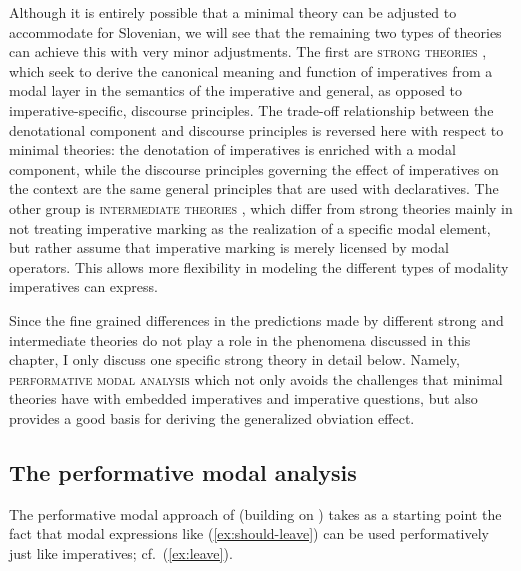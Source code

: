 \documentclass[output=paper,colorlinks,citecolor=brown]{langscibook}
\begin{document}
Although it is entirely possible that a minimal theory can be adjusted to accommodate for Slovenian, we will see that the remaining two types of theories can achieve this with very minor adjustments. The first are \textsc{strong theories} \citep[e.g.][]{schwagerDISS,kaufmannBOOK,grosz09nels,condoravdi-lauer12cssp}, which seek to derive the canonical meaning and function of imperatives from a modal layer in the semantics of the imperative and general, as opposed to imperative-specific, discourse principles. The trade-off relationship between the denotational component and discourse principles is reversed here with respect to minimal theories: the denotation of imperatives is enriched with a modal component, while the discourse principles governing the effect of imperatives on the context are the same general principles that are used with declaratives. 
The other group is \textsc{intermediate theories} \citep[e.g.][]{portner97,roberts15,oikonomou16}, which differ from strong theories mainly in not treating imperative marking as the realization of a specific modal element, but rather assume that imperative marking is merely licensed by modal operators. This allows more flexibility in modeling the different types of modality imperatives can express. 

Since the fine grained differences in the predictions made by different strong and intermediate theories do not play a role in the phenomena discussed in this chapter, I only discuss one specific strong theory in detail below. Namely,  \textsc{performative modal analysis} which not only avoids the challenges that minimal theories have with embedded imperatives and imperative questions, but also provides a good basis for deriving the generalized obviation effect.

\subsection{The performative modal analysis}
\label{subsec:performative}

The performative modal approach of \textcite{kaufmannBOOK} (building on \cite{lewis79permission,schwagerDISS,ninan05}) takes as a starting point the fact that modal expressions like (\ref{ex:should-leave}) can be used performatively just like imperatives; cf.~(\ref{ex:leave}).

\ea {}
\z\z    
\end{document}
